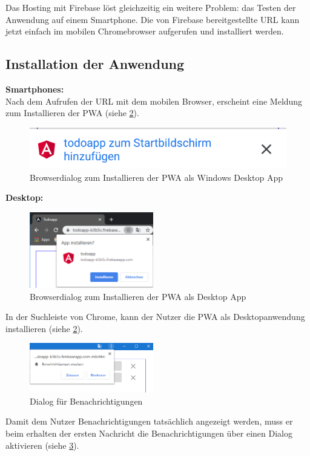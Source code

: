 Das Hosting mit Firebase löst gleichzeitig ein weitere Problem: das Testen der Anwendung auf einem Smartphone. Die von Firebase bereitgestellte URL kann jetzt einfach im mobilen Chromebrowser aufgerufen und installiert werden.

\subsection{Installation der Anwendung}
\textbf{Smartphones:}\\
Nach dem Aufrufen der URL mit dem mobilen Browser, erscheint eine Meldung zum Installieren der PWA (siehe \ref{fig:dialog_install_pwa_mobile}).

\begin{figure}[h]
	\includegraphics[scale=0.5]{img/pwa_add_to_homescreen.png}
	\centering
	\caption{Browserdialog zum Installieren der PWA als Windows Desktop App}
	\label{fig:dialog_install_pwa_mobile}
\end{figure}

\textbf{Desktop:}
\begin{figure}
	\vspace{-10pt}
	\includegraphics[width=0.48\textwidth]{img/add_to_desktop_2.PNG}
	\caption{Browserdialog zum Installieren der PWA als Desktop App}
	\label{fig:dialog_install_pwa_mobile}
	\vspace{-10pt}
\end{figure}
In der Suchleiste von Chrome, kann der Nutzer die PWA als Desktopanwendung installieren (siehe \ref{fig:dialog_install_pwa_mobile}).
\begin{figure}
	\vspace{-10pt}
	\includegraphics[width=0.48\textwidth]{img/berechtigungen_zulassen.PNG}
	\centering
	\caption{Dialog für Benachrichtigungen}
	\label{fig:pwa_benachrichtigungen_zulassen}
	\vspace{-10pt}
\end{figure}
Damit dem Nutzer Benachrichtigungen tatsächlich angezeigt werden, muss er beim erhalten der ersten Nachricht die Benachrichtigungen über einen Dialog aktivieren (siehe \ref{fig:pwa_benachrichtigungen_zulassen}).

